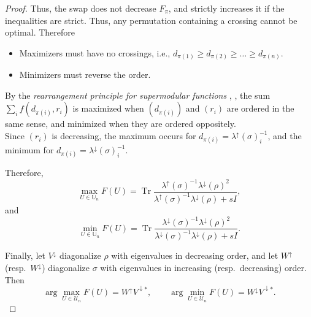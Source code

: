\documentclass[10pt,reqno]{amsart}
\theoremstyle{break-italic}
\theoremstyle{break-italic}
\theoremstyle{break-italic}
\theoremstyle{break-italic}
\theoremstyle{break-italic}
\theoremstyle{break-italic}
\theoremstyle{break-italic}
\theoremstyle{break-italic}
\theoremstyle{break-roman}
\theoremstyle{standard}
\theoremstyle{varthm-roman}
\theoremstyle{varthm-italic}
\theoremstyle{varthm-roman-break}
\theoremstyle{varthm-italic-break}
\theoremstyle{varthm-roman-no-punctuation}
\theoremstyle{varthm-italic-no-punctuation}
\numberwithin{equation}{section}
\begin{document}
\begin{proof}
Thus, the swap does not decrease $F_\pi$, and strictly increases it if the inequalities are strict. Thus, any permutation containing a crossing cannot be optimal. Therefore
\begin{itemize}
    \item Maximizers must have no crossings, i.e., $d_{\pi(1)} \ge d_{\pi(2)} \ge \dots \ge d_{\pi(n)}$.
    \item Minimizers must reverse the order.
\end{itemize}

By the \textit{rearrangement principle for supermodular functions} \cite[Ch.~10]{HLP52}, \cite[Ch.~2]{Top98},
the sum $\displaystyle\sum_i f(d_{\pi(i)},r_i)$ is maximized when
$(d_{\pi(i)})$ and $(r_i)$ are ordered in the same sense,
and minimized when they are ordered oppositely. \\
Since $(r_i)$ is decreasing, the maximum occurs for
$d_{\pi(i)}=\lambda^\uparrow(\sigma)^{-1}_i$, and the minimum for
$d_{\pi(i)}=\lambda^\downarrow(\sigma)^{-1}_i$.

Therefore,
$$
\max_{U\in\mathbb  U_n} F(U)
=\operatorname{Tr}\frac{\lambda^\uparrow(\sigma)^{-1}\lambda^\downarrow(\rho)^2}
{\lambda^\uparrow(\sigma)^{-1}\lambda^\downarrow(\rho)+sI},
$$
and
$$
\min_{U\in\mathbb U_n} F(U)
=\operatorname{Tr}\frac{\lambda^\downarrow(\sigma)^{-1}\lambda^\downarrow(\rho)^2}
{\lambda^\downarrow(\sigma)^{-1}\lambda^\downarrow(\rho)+sI}.
$$

Finally, let $V^\downarrow$ diagonalize $\rho$ with eigenvalues in decreasing order,
and let $W^\uparrow$ (resp.\ $W^\downarrow$) diagonalize $\sigma$ with eigenvalues
in increasing (resp.\ decreasing) order.
Then
$$
\arg\max_{U\in\mathcal U_n} F(U)=W^\uparrow V^{\downarrow *},
\qquad
\arg\min_{U\in\mathcal U_n} F(U)=W^\downarrow V^{\downarrow *}.
$$
\end{proof}
\end{document}
